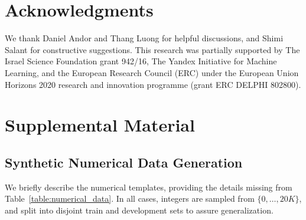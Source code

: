 \documentclass[11pt,a4paper]{article}
\begin{document}
\section*{Acknowledgments}
We thank Daniel Andor and Thang Luong for helpful discussions, and Shimi Salant for constructive suggestions.
This research was partially supported by
The Israel Science Foundation grant 942/16, 
The Yandex Initiative for Machine Learning, and the European Research Council (ERC) under the European Union Horizons 2020 research and innovation programme (grant ERC DELPHI 802800).





\clearpage

\appendix

\section{Supplemental Material}
\label{sec:supplemental}








\subsection{Synthetic Numerical Data Generation}
\label{section:numerical_data_details}

We briefly describe the numerical templates, providing the details missing from Table~\ref{table:numerical_data}. In all cases, integers are sampled from $\{0,\ldots,20K\}$, and split into disjoint train and development sets to assure generalization.
\end{document}
